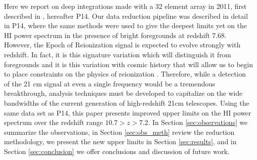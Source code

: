 \documentclass[preprint2]{aastex}
\begin{document}
Here we report on deep integrations made with a 32 element array in 2011, first described in \cite{Parsons:2014p10499}, hereafter P14.  Our data reduction pipeline was described in detail in P14, where the same methods were used to give the deepest limits yet on the HI power spectrum in the presence of bright foregrounds at redshift 7.68.  However, the Epoch of Reionization signal is expected to evolve strongly with redshift. In fact, it is this signature variation which will distinguish it from foregrounds and it is this variation with cosmic history that will allow us to begin to place constraints on the physics of reionization \citep{Pritchard:2008p8123,Pober:2014p10390}.  Therefore, while a detection of the 21 cm signal at even a single frequency would be a tremendous breakthrough, analysis techniques must be developed to capitalize on the wide bandwidths of the current generation of high-redshift 21cm telescopes.  Using the same data set as P14, this paper presents improved upper limits on the HI power spectrum over the redshift range $10.7>z>7.2$.  In Section  \ref{sec:observations} we summarize the observations, in Section \ref{sec:obs_meth} review the reduction methodology, we present the new upper limits in Section \ref{sec:results}, and in Section \ref{sec:conclusion} we offer conclusions and discussion of future work.



%


\end{document}
